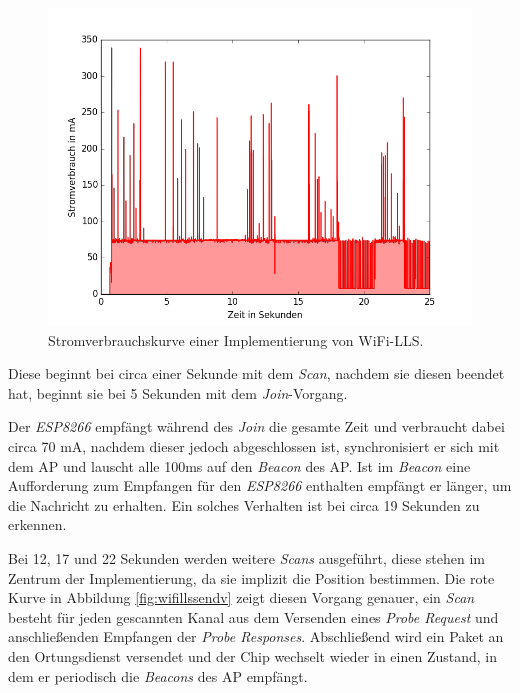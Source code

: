 \begin{figure}[h!]
  \centering
	\includegraphics[width=\textwidth]{plots/wifills.png}
  \caption{Stromverbrauchskurve einer Implementierung von WiFi-LLS.}
  \label{fig:wifills}
\end{figure}

Diese beginnt bei circa einer Sekunde mit dem \emph{Scan}, nachdem sie diesen beendet hat, beginnt sie bei 5 Sekunden mit dem \emph{Join}-Vorgang.

Der \emph{ESP8266} empfängt während des \emph{Join} die gesamte Zeit und verbraucht dabei circa 70 mA, nachdem dieser jedoch abgeschlossen ist, synchronisiert er sich mit dem AP und lauscht alle 100ms auf den \emph{Beacon} des AP.
Ist im \emph{Beacon} eine Aufforderung zum Empfangen für den \emph{ESP8266} enthalten empfängt er länger, um die Nachricht zu erhalten.
Ein solches Verhalten ist bei circa 19 Sekunden zu erkennen.

Bei 12, 17 und 22 Sekunden werden weitere \emph{Scans} ausgeführt, diese stehen im Zentrum der Implementierung, da sie implizit die Position bestimmen.
Die rote Kurve in Abbildung \ref{fig:wifillssendv} zeigt diesen Vorgang genauer, ein \emph{Scan} besteht für jeden gescannten Kanal aus dem Versenden eines \emph{Probe Request} und anschließenden Empfangen der \emph{Probe Responses}. 
Abschließend wird ein Paket an den Ortungsdienst versendet und der Chip wechselt wieder in einen Zustand, in dem er periodisch die \emph{Beacons} des AP empfängt.


